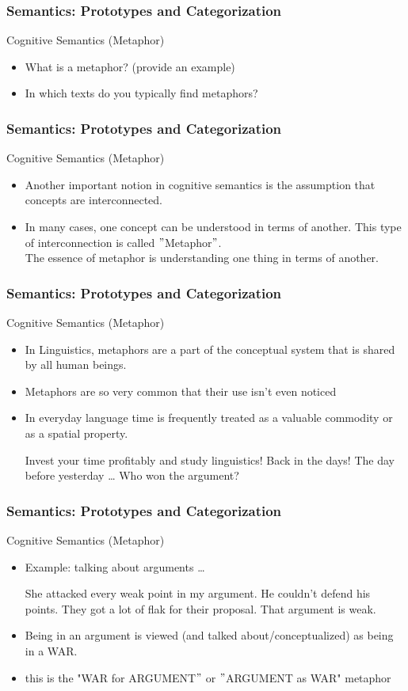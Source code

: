 \documentclass[12pt, table]{beamer}
\begin{document}
\begin{frame}
\frametitle{Semantics: Prototypes and Categorization}
Cognitive Semantics (Metaphor)
\begin{itemize}
\item What is a metaphor? (provide an example)
\item In which texts do you typically find metaphors?
\end{itemize}
\end{frame}

\begin{frame}
\frametitle{Semantics: Prototypes and Categorization}
Cognitive Semantics (Metaphor)
\begin{itemize}
\item Another important notion in cognitive semantics is the assumption that concepts are interconnected. 
\item In many cases, one concept can be understood in terms of another. This type of interconnection is called $"$Metaphor$"$.\\[.5cm]
The essence of metaphor is understanding one thing in terms of another. \citep{lakoff1980metaphorical}
\end{itemize}
\end{frame}

\begin{frame}
\frametitle{Semantics: Prototypes and Categorization}
Cognitive Semantics (Metaphor)
\begin{itemize}
\item In Linguistics, metaphors are a part of the conceptual system that is shared by all human beings.
\item Metaphors are so very common that their use isn't even noticed
\item In everyday language time is frequently treated as a valuable commodity or as a spatial property.
\begin{exe}
\ex Invest your time profitably and study linguistics! 
\ex Back in the days!
\ex The day before yesterday \dots
\ex Who won the argument? 
\end{exe}
\end{itemize}
\end{frame}

\begin{frame}
\frametitle{Semantics: Prototypes and Categorization}
Cognitive Semantics (Metaphor)
\begin{itemize}
\item Example: talking about arguments \dots
\begin{exe}
\ex She attacked every weak point in my argument.
\ex He couldn't defend his points.
\ex They got a lot of flak for their proposal.
\ex That argument is weak.
\end{exe}
\item Being in an argument is viewed (and talked about/conceptualized) as being in a WAR.
\item this is the "WAR for ARGUMENT$"$ or $"$ARGUMENT as WAR"  metaphor 
\end{itemize}
\end{frame}
\end{document}
